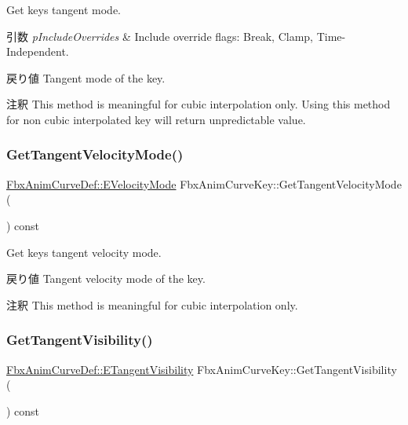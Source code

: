 Get key\textquotesingle{}s tangent mode. 
\begin{DoxyParams}{引数}
{\em p\+Include\+Overrides} & Include override flags\+: Break, Clamp, Time-\/\+Independent. \\
\hline
\end{DoxyParams}
\begin{DoxyReturn}{戻り値}
Tangent mode of the key. 
\end{DoxyReturn}
\begin{DoxyRemark}{注釈}
This method is meaningful for cubic interpolation only. Using this method for non cubic interpolated key will return unpredictable value. 
\end{DoxyRemark}
\mbox{\label{class_fbx_anim_curve_key_af8b7bc72b42857f9a713ca3f443cd55b}} 
\subsubsection{\texorpdfstring{Get\+Tangent\+Velocity\+Mode()}{GetTangentVelocityMode()}}
{\footnotesize\ttfamily \hyperlink{class_fbx_anim_curve_def_a747576beffa78ab236d2e140da395fff}{Fbx\+Anim\+Curve\+Def\+::\+E\+Velocity\+Mode} Fbx\+Anim\+Curve\+Key\+::\+Get\+Tangent\+Velocity\+Mode (\begin{DoxyParamCaption}{ }\end{DoxyParamCaption}) const}

Get key\textquotesingle{}s tangent velocity mode. \begin{DoxyReturn}{戻り値}
Tangent velocity mode of the key. 
\end{DoxyReturn}
\begin{DoxyRemark}{注釈}
This method is meaningful for cubic interpolation only. 
\end{DoxyRemark}
\mbox{\label{class_fbx_anim_curve_key_ada99141bd5cd9218fe7eaa4ce00ae5db}} 
\subsubsection{\texorpdfstring{Get\+Tangent\+Visibility()}{GetTangentVisibility()}}
{\footnotesize\ttfamily \hyperlink{class_fbx_anim_curve_def_a70c49072776ac6b3426c57dd80e16e3b}{Fbx\+Anim\+Curve\+Def\+::\+E\+Tangent\+Visibility} Fbx\+Anim\+Curve\+Key\+::\+Get\+Tangent\+Visibility (\begin{DoxyParamCaption}{ }\end{DoxyParamCaption}) const}

